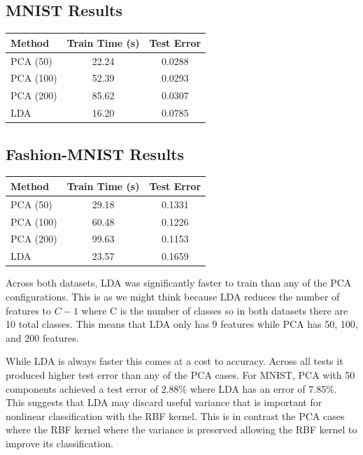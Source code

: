 \documentclass{article}
\begin{document}
\subsection*{MNIST Results}

\begin{center}
\begin{tabular}{lcc}
\toprule
Method & Train Time (s) & Test Error \\
\midrule
PCA (50)  & 22.24 & 0.0288 \\
PCA (100) & 52.39 & 0.0293 \\
PCA (200) & 85.62 & 0.0307 \\
LDA       & 16.20 & 0.0785 \\
\bottomrule
\end{tabular}
\end{center}

\subsection*{Fashion-MNIST Results}

\begin{center}
\begin{tabular}{lcc}
\toprule
Method & Train Time (s) & Test Error \\
\midrule
PCA (50)  & 29.18 & 0.1331 \\
PCA (100) & 60.48 & 0.1226 \\
PCA (200) & 99.63 & 0.1153 \\
LDA       & 23.57 & 0.1659 \\
\bottomrule
\end{tabular}
\end{center}

Across both datasets, LDA was significantly faster to train than any of the PCA configurations. This is as we might think because LDA reduces the number of features to $C-1$ where C is the number of classes so in both datasets there are 10 total classes. This means that LDA only has 9 features while PCA has 50, 100, and 200 features. 

While LDA is always faster this comes at a cost to accuracy. Across all tests it produced higher test error than any of the PCA cases. For MNIST, PCA with 50 components achieved a test error of 2.88\% where LDA has an error of 7.85\%. This suggests that LDA may discard useful variance that is important for nonlinear classification with the RBF kernel.  This is in contrast the PCA cases where the RBF kernel where the variance is preserved allowing the RBF kernel to improve its classification. 
\end{document}

